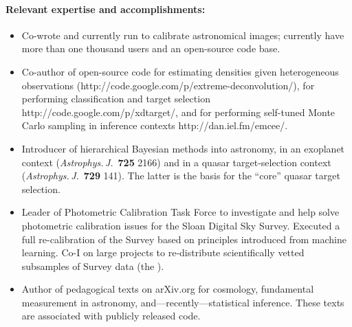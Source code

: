 \documentclass[letterpaper,12pt]{article}
\begin{document}
\paragraph{Relevant expertise and accomplishments:}
\begin{itemize}\setlength{\itemsep}{0pt}
\item
Co-wrote and currently run  to calibrate
astronomical images; currently have more than one thousand users and
an open-source code base.
\item
Co-author of open-source code for estimating densities
given heterogeneous observations
(http://code.google.com/p/extreme-deconvolution/), for performing
classification and target selection
http://code.google.com/p/xdtarget/, and for performing self-tuned Monte
Carlo sampling in inference contexts http://dan.iel.fm/emcee/.
\item
Introducer of hierarchical Bayesian methods into astronomy, in an
exoplanet context (\textit{Astrophys.\,J.}\ \textbf{725} 2166) and in
a quasar target-selection context
(\textit{Astrophys.\,J.}\ \textbf{729} 141).  The latter is the basis
for the  ``core'' quasar target selection.
\item
Leader of Photometric Calibration Task Force to investigate and help
solve photometric calibration issues for the Sloan Digital Sky Survey.
Executed a full re-calibration of the Survey based on principles
introduced from machine learning.  Co-I on large projects to
re-distribute scientifically vetted subsamples of Survey data (the
).
\item
Author of pedagogical texts on arXiv.org for cosmology, fundamental
measurement in astronomy, and---recently---statistical inference.
These texts are associated with publicly released code.
\end{itemize}
\end{document}
